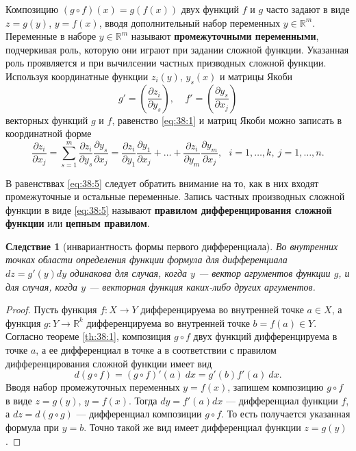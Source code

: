 \documentclass[12pt]{report}
\numberwithin{equation}{section}
\newtheorem{remark}{Следствие}[section]
\begin{document}
Композицию $(g \circ f) (x) = g(f(x))$ двух функций $f$ и $g$ часто задают в виде $z = g(y)$, $y = f(x)$, вводя дополнительный набор переменных $y \in \mathbb{R}^m$. Переменные в наборе  $y \in \mathbb{R}^m$ называют \textbf{промежуточными переменными}, подчеркивая роль, которую они играют при задании сложной функции. Указанная роль проявляется и при вычилсении частных призводных сложной функции. Используя координатные функции $z_i (y)$, $y_s(x)$ и матрицы Якоби
\[ g' = \left( \frac{\partial z_i}{\partial y_s} \right),~~~~~ f' = \left( \frac{\partial y_s}{\partial x_j} \right)\]
векторных функций $g$ и $f$, равенство \eqref{eq:38:1} и матриц Якоби можно записать в координатной форме
\begin{equation} \label{eq:38:5}
\frac{\partial z_i}{\partial x_j} = \sum_{s = 1}^m \frac{\partial z_i}{\partial y_s}\frac{\partial y_s}{\partial x_j} = \frac{\partial z_i}{\partial y_1} \frac{\partial y_1}{\partial x_j} + \dots + \frac{\partial z_i}{\partial y_m} \frac{\partial y_m}{\partial x_j},~~~i = 1, \ldots, k,~j = 1, \ldots, n.
\end{equation}

В равенстввах \eqref{eq:38:5} следует обратить внимание на то, как в них входят промежуточные и остальные переменные. Запись частных производных сложной функции в виде \eqref{eq:38:5} называют \textbf{правилом дифференцирования сложной функции} или \textbf{цепным правилом}.

\begin{remark}[инвариантность формы первого дифференциала] \label{rem:38:1}
Во внутренних точках области определения функции формула для дифференциала $dz = g'(y)dy$ одинакова для случая, когда $y$ --- вектор агрументов функции $g$, и для случая, когда $y$ --- векторная функция каких-либо других аргументов.
\end{remark}
\begin{proof}
Пусть функция $f : X \to Y$ дифференцируема во внутренней точке $a \in X$, а функция $g : Y \to \mathbb{R}^k$ дифференцируема во внутренней точке $b = f(a) \in Y$. Согласно теореме \ref{th:38:1}, композиция $g \circ f$ двух функций дифференцируема в точке $a$, а ее дифференциал в точке $а$ в соответствии с правилом дифференцирования сложной функции имеет вид
\[ d(g \circ f) = (g \circ f)'(a)~dx = g'(b) f'(a) ~dx.\]
Вводя набор промежуточных переменных $y = f(x)$, запишем композицию $g \circ f$ в виде $z = g(y)$, $y = f(x)$. Тогда $dy = f'(a)dx$ --- дифференциал функции $f$, а $dz  =d(g \circ g)$ --- дифференциал композиции $g \circ f$. То есть получается указанная формула при $ y = b$. Точно такой же вид имеет дифференциал функции $z = g(y)$.
\end{proof}
\end{document}
